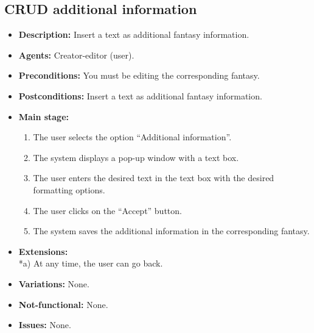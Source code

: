 \subsection{CRUD additional information}
\begin{itemize}
	\item \textbf{Description:} Insert a text as additional fantasy information.
	\item \textbf{Agents:} Creator-editor (user).
	\item \textbf{Preconditions:} You must be editing the corresponding fantasy.
	\item \textbf{Postconditions:} Insert a text as additional fantasy information.
	\item \textbf{Main stage:}
	\begin{enumerate}
		\item The user selects the option ``Additional information''.
		\item The system displays a pop-up window with a text box.
		\item The user enters the desired text in the text box with the desired formatting options.
		\item The user clicks on the ``Accept'' button.
		\item The system saves the additional information in the corresponding fantasy.
	\end{enumerate}
	\item \textbf{Extensions:} \\ *a) At any time, the user can go back.
	\item \textbf{Variations:} None.
	\item \textbf{Not-functional:} None.
	\item \textbf{Issues:} None.
\end{itemize}

